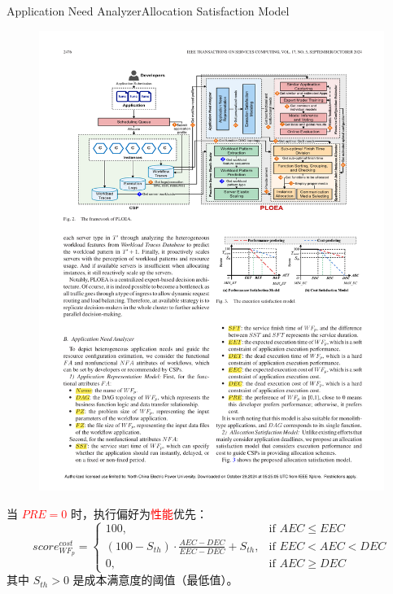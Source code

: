 \documentclass[aspectratio=169]{beamer}
\begin{document}
\begin{frame}{Application Need Analyzer}{Allocation Satisfaction Model}
  \begin{figure}
    \centering
    \includegraphics[height=0.4\textheight]{img/method/satisfaction-model.pdf}
  \end{figure}
  当 \textcolor{red}{$PRE=0$} 时，执行偏好为\textcolor{red}{性能}优先：
  \begin{equation*}
    score_{WF_p}^{cost} =
    \begin{cases}
      100, & \text{if } AEC \leqslant EEC \\
      (100-S_{th}) \cdot \frac{AEC - DEC}{EEC - DEC} + S_{th}, & \text{if } EEC < AEC < DEC \\
      0, & \text{if } AEC \geqslant DEC
    \end{cases}
  \end{equation*}
  其中 $S_{th}>0$ 是成本满意度的阈值（最低值）。
\end{frame}
\end{document}
